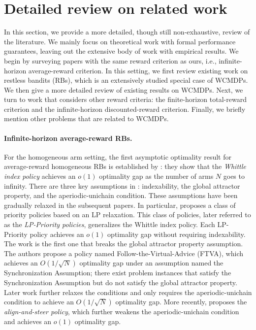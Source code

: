 \documentclass{article}
\theoremstyle{plain}
\theoremstyle{remark}
\begin{document}
\section{Detailed review on related work}
\label{app:additional-related-work}
In this section, we provide a more detailed, though still non-exhaustive, review of the literature. 
We mainly focus on theoretical work with formal performance guarantees, leaving out the extensive body of work with empirical results.
We begin by surveying papers with the same reward criterion as ours, i.e., infinite-horizon average-reward criterion. 
In this setting, we first review existing work on restless bandits (RBs), which is an extensively studied special case of WCMDPs. 
We then give a more detailed review of existing results on WCMDPs.
Next, we turn to work that considers other reward criteria: the finite-horizon total-reward criterion and the infinite-horizon discounted-reward criterion. 
Finally, we briefly mention other problems that are related to WCMDPs. 


\paragraph{Infinite-horizon average-reward RBs.}
For the homogeneous arm setting, the first asymptotic optimality result for average-reward homogeneous RBs is established by \citet{WebWei_90}: they show that the \emph{Whittle index policy} \citep{Whi_88_rb} achieves an $o(1)$ optimality gap as the number of arms $N$ goes to infinity. There are three key assumptions in \citep{WebWei_90}: indexability, the global attractor property, and the aperiodic-unichain condition.
These assumptions have been gradually relaxed in the subsequent papers. In particular, \cite{Ver_16_verloop} proposes a class of priority policies based on an LP relaxation. This class of policies, later referred to as the \emph{LP-Priority policies}, generalizes the Whittle index policy. Each LP-Priority policy achieves an $o(1)$ optimality gap without requiring indexability.
The work \citep{HonXieChe_23} is the first one that breaks the global attractor property assumption.
The authors propose a policy named Follow-the-Virtual-Advice (FTVA), which achieves an $O(1/\sqrt{N})$ optimality gap under an assumption named the Synchronization Assumption;
there exist problem instances that satisfy the Synchronization Assumption but do not satisfy the global attractor property.
Later work \citep{HonXieChe_24} further relaxes the conditions and only requires the aperiodic-unichain condition to achieve an $O(1/\sqrt{N})$ optimality gap.
More recently, \citet{Yan_24} proposes the \emph{align-and-steer policy}, which further weakens the aperiodic-unichain condition and achieves an $o(1)$ optimality gap.
\end{document}
